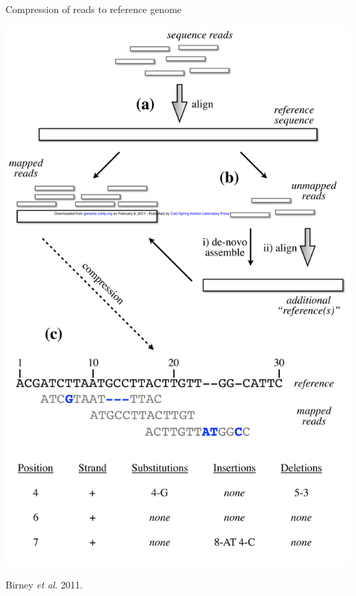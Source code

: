 \documentclass{beamer}
\begin{document}
\begin{frame}{Compression of reads to reference genome}

 \centerline{ \includegraphics[height=.8\textheight]{BirneyEtAl.pdf} }
Birney {\em et al}. 2011.

\end{frame}
\end{document}
